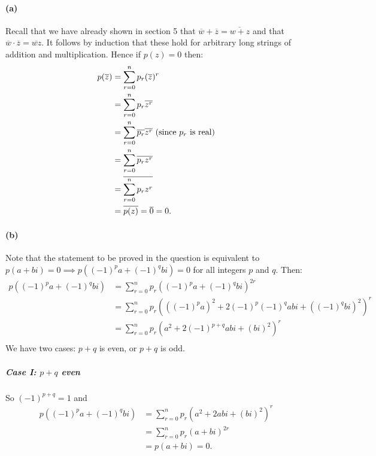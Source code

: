 \documentclass[a4paper,10pt]{article}
\begin{document}
\paragraph{(a)} Recall that we have already shown in section 5 that $ \overline{w} + \overline{z} = \overline{w + z} $ and
that $ \overline{w} \cdot \overline{z} = \overline{wz} $. It follows by induction that these hold for arbitrary long strings
of addition and multiplication. Hence if $ p(z) = 0 $ then:
\begin{align*}
  p(\overline{z}) &= \sum^n_{r = 0} p_r (\overline{z})^r\\
                  &= \sum^n_{r = 0} p_r \overline{z^r}\\
                  &= \sum^n_{r = 0} \overline{p_r} \overline{z^r} \text{ (since $ p_r $ is real)}\\
                  &= \sum^n_{r = 0} \overline{p_r z^r}\\
                  &= \overline{\sum^n_{r = 0} p_r z^r}\\
                  &= \overline{p(z)} = \overline{0} = 0.
\end{align*}

\paragraph{(b)}
Note that the statement to be proved in the question is equivalent to $ p(a + bi) = 0 \implies p((-1)^p a + (-1)^q bi) = 0 $ for all
integers $ p $ and $ q $. Then:
\begin{align*}
  p((-1)^p a + (-1)^q bi) &= \sum^n_{r = 0} p_r ((-1)^p a + (-1)^q bi)^{2r}\\
                          &= \sum^n_{r = 0} p_r \left(((-1)^p a)^2 + 2(-1)^p (-1)^q abi + ((-1)^q bi)^2\right)^{r}\\
                          &= \sum^n_{r = 0} p_r \left(a^2 + 2(-1)^{p + q} abi + (bi)^2\right)^r\\
\end{align*}
We have two cases: $ p + q $ is even, or $ p + q $ is odd.

\subparagraph{Case I: $ p + q $ even}
So $ (-1)^{p + q} = 1 $ and
\begin{align*}
  p((-1)^p a + (-1)^q bi) &= \sum^n_{r = 0} p_r \left(a^2 + 2abi + (bi)^2\right)^r\\
                          &= \sum^n_{r = 0} p_r (a + bi)^{2r}\\
                          &= p(a + bi) = 0.
\end{align*}
\end{document}

